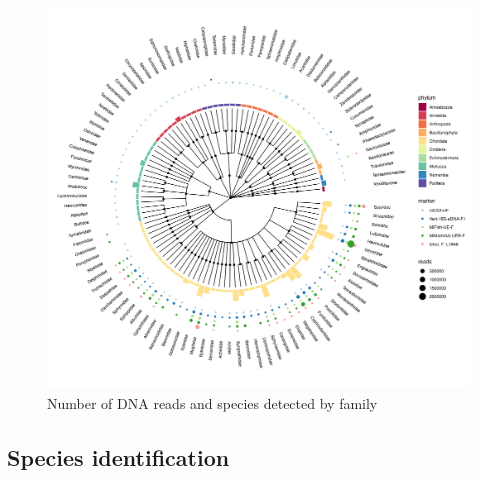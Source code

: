 \documentclass[10pt]{article}
\begin{document}




\clearpage

%

\begin{figure}[h!]
\centering
\includegraphics[width=\textwidth]{tree}
\caption{Number of DNA reads and species detected by family}
\end{figure}

\clearpage

\subsection*{Species identification}
\end{document}
